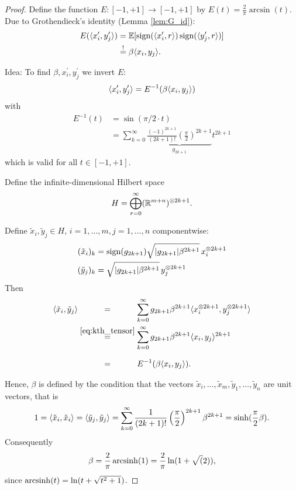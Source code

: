 \begin{proof}
	Define the function $E: [-1,+1] \to [-1,+1]$ by $E(t)=\frac{2}{\pi}\arcsin(t)$. Due to Grothendieck's identity (Lemma \ref{lem:G_id}):
	\begin{align*}
		E(\langle{x_i^\prime},{y_j^\prime}\rangle ) &= \mathbb{E}[\operatorname{sign}(\langle{x_i^\prime},{r}\rangle)\operatorname{sign}(\langle{y_j^\prime},{r}\rangle)]\\
		&\overset{!}{=}\beta \langle{x_i},{y_j}\rangle.
	\end{align*}
	
	\noindent Idea: To find $\beta,x_i^\prime,y_j^\prime$ we invert $E$:
	\[
		\langle{x_i^\prime},{y_j^\prime}\rangle = E^{-1} (\beta \langle{x_i},{y_j}\rangle)	
	\]
	with 
	\begin{align*}
		E^{-1}(t) &= \sin(\pi/2 \cdot t) \\
		&= \sum_{k=0}^\infty \underbrace{\frac{(-1)^{2k+1}}{(2k+1)!}\left(\frac{\pi}{2}\right)^{2k+1}}_{g_{2k+1}}  t^{2k+1}
	\end{align*}
	which is valid for all $t\in[-1,+1]$.
	
	Define the infinite-dimensional Hilbert space
	\begin{equation}
		H= \bigoplus_{r=0}^\infty (\mathbb{R}^{m+n})^{\otimes 2k+1}.
	\end{equation}
	
	Define $\tilde{x}_i, \tilde{y}_j\in H$, $i=1,\dots,m,j=1,\dots,n$ componentwise:
	\begin{align*}
		(\tilde{x}_i)_k &= \operatorname{sign}(g_{2k+1}) \sqrt{{\left|{g_{2k+1}}\right|}\beta^{2k+1}}\, x_i^{\otimes 2k+1} \\
		(\tilde{y}_j)_k &= \sqrt{{\left|{g_{2k+1}}\right|}\beta^{2k+1}} \,y_j^{\otimes 2k+1}
	\end{align*}
	Then 
	\begin{align*}
		\sclr{\tilde{x}_i}{\tilde{y}_j} &\overset{\textcolor{white}{\eqref*{eq:kth_tensor}}}{=} \sum_{k=0}^\infty g_{2k+1} \beta^{2k+1}\sclr{x_i^{\tensor 2k+1}}{y_j^{\tensor 2k+1}} \\
		&\overset{\eqref{eq:kth_tensor}}{=} \sum_{k=0}^\infty g_{2k+1} \beta^{2k+1} \sclr{x_i}{y_j}^{2k+1} \\
		&\overset{\textcolor{white}{\eqref*{eq:kth_tensor}}}{=} E^{-1}(\beta \sclr{x_i}{y_j}).
	\end{align*}
	
	Hence, $\beta$ is defined by the condition that the vectors $\tilde{x}_i,\dots,\tilde{x}_m,\tilde{y}_1,\dots,\tilde{y}_n$ are unit vectors, that is
	\[
		1 = \langle{\tilde{x}_i},{\tilde{x}_i}\rangle = \langle{\tilde{y}_j},{\tilde{y}_j}\rangle
		= \sum_{k=0}^\infty \frac{1}{(2k+1)!}\left(\frac{\pi}{2}\right)^{2k+1}\beta^{2k+1}=\sinh(\frac{\pi}{2}\beta).
	\]
	Consequently
	\[
		\beta = \frac{2}{\pi} \operatorname{arcsinh}(1) = \frac{2}{\pi}\ln(1+\sqrt(2)),	
	\]
	since $\operatorname{arcsinh} (t) = \ln(t+\sqrt{t^2+1})$.


\end{proof}
